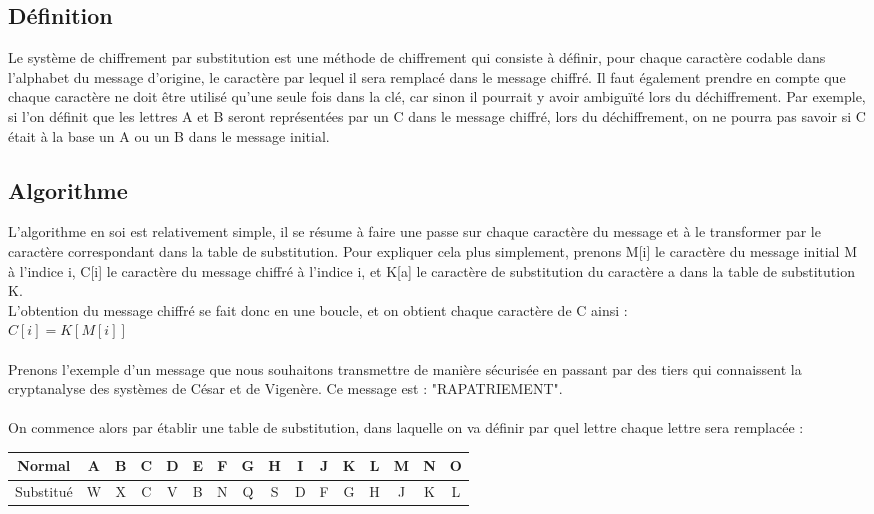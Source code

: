		\subsection{Définition}
			Le système de chiffrement par substitution est une méthode de chiffrement qui consiste à définir, pour chaque caractère codable dans l'alphabet du message d'origine, le caractère par lequel il sera remplacé dans le message chiffré. Il faut également prendre en compte que chaque caractère ne doit être utilisé qu'une seule fois dans la clé, car sinon il pourrait y avoir ambiguïté lors du déchiffrement. Par exemple, si l'on définit que les lettres A et B seront représentées par un C dans le message chiffré, lors du déchiffrement, on ne pourra pas savoir si C était à la base un A ou un B dans le message initial.
		\subsection{Algorithme}
			L'algorithme en soi est relativement simple, il se résume à faire une passe sur chaque caractère du message et à le transformer par le caractère correspondant dans la table de substitution. Pour expliquer cela plus simplement, prenons M[i] le caractère du message initial M à l'indice i, C[i] le caractère du message chiffré à l'indice i, et K[a] le caractère de substitution du caractère a dans la table de substitution K.\\
			L'obtention du message chiffré se fait donc en une boucle, et on obtient chaque caractère de C ainsi :\\
			$C[i] = K[M[i]]$\\
			\\
			Prenons l'exemple d'un message que nous souhaitons transmettre de manière sécurisée en passant par des tiers qui connaissent la cryptanalyse des systèmes de César et de Vigenère. Ce message est : "RAPATRIEMENT".\\
			\\
			On commence alors par établir une table de substitution, dans laquelle on va définir par quel lettre chaque lettre sera remplacée : \\
			\begin{tabular}{ | c | c | c | c | c | c | c | c | c | c | c | c | c | c | c | c | }
				\hline
				Normal&A&B&C&D&E&F&G&H&I&J&K&L&M&N&O\\ \hline
				Substitué&W&X&C&V&B&N&Q&S&D&F&G&H&J&K&L\\
				\hline
			\end{tabular}\\
